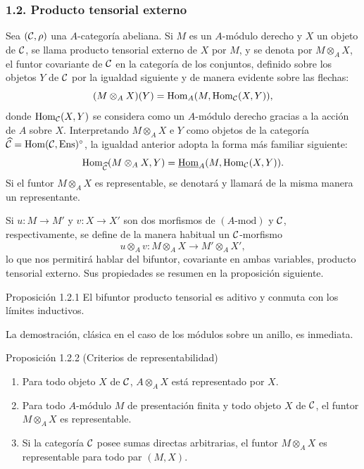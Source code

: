 \subsubsection*{1.2. Producto tensorial externo}
Sea $(\mathcal C,\rho)$ una $A$-categoría abeliana. Si $M$ es un $A$-módulo derecho y $X$ un objeto de $\mathcal C$, se llama producto tensorial externo de $X$ por $M$, y se denota por $M\otimes_A X$, el funtor covariante de $\mathcal C$ en la categoría de los conjuntos, definido sobre los objetos $Y$ de $\mathcal C$ por la igualdad siguiente y de manera evidente sobre las flechas:
\[
(M\otimes_A X)(Y)=\operatorname{Hom}_A(M,\operatorname{Hom}_{\mathcal C}(X,Y)),
\]
donde $\operatorname{Hom}_{\mathcal C}(X,Y)$ se considera como un $A$-módulo derecho gracias a la acción de $A$ sobre $X$. Interpretando $M\otimes_AX$ e $Y$ como objetos de la categoría $\widehat{\mathcal C}=\operatorname{Hom}(\mathcal C,\operatorname{Ens})^{\circ}$, la igualdad anterior adopta la forma más familiar siguiente:
\[
\operatorname{Hom}_{\widehat{\mathcal C}}(M\otimes_A X,Y)=\underline{\operatorname{Hom}}_A(M,\operatorname{Hom}_{\mathcal C}(X,Y)).
\]
Si el funtor $M\otimes_A X$ es representable, se denotará y llamará de la misma manera un representante.

Si $u:M\to M'$ y $v:X\to X'$ son dos morfismos de $(A\text{-mod})$ y $\mathcal C$, respectivamente, se define de la manera habitual un $\mathcal C$-morfismo
\[
u\otimes_A v:M\otimes_A X\longrightarrow M'\otimes_A X',
\]
lo que nos permitirá hablar del bifuntor, covariante en ambas variables, producto tensorial externo. Sus propiedades se resumen en la proposición siguiente.

\begin{statement}{Proposición 1.2.1}
El bifuntor producto tensorial es aditivo y conmuta con los límites inductivos.
\end{statement}
La demostración, clásica en el caso de los módulos sobre un anillo, es inmediata.

\begin{statement}{Proposición 1.2.2 (Criterios de representabilidad)}
\begin{enumerate}[label=(\alph*)]
\item Para todo objeto $X$ de $\mathcal C$, $A\otimes_AX$ está representado por $X$.
\item Para todo $A$-módulo $M$ de presentación finita y todo objeto $X$ de $\mathcal C$, el funtor $M\otimes_AX$ es representable.
\item Si la categoría $\mathcal C$ posee sumas directas arbitrarias, el funtor $M\otimes_A X$ es representable para todo par $(M,X)$.
\end{enumerate}
\end{statement}

